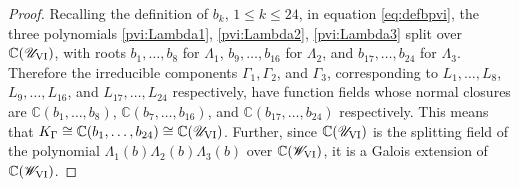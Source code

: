 \documentclass[a4paper,reqno]{amsart}
\numberwithin{equation}{section}
\newcommand{\C}{\mathbb{C}}
\numberwithin{equation}{section}
\begin{document}
\begin{proof}
Recalling the definition of $b_k$, $1\leq k\leq 24$, in equation \eqref{eq:defbpvi}, the three polynomials \eqref{pvi:Lambda1}, \eqref{pvi:Lambda2}, \eqref{pvi:Lambda3} split over $\C(\mathscr{U}_{\rm{VI}})$, with roots $b_1,\dots,b_8$ for $\Lambda_1$,  $b_9,\dots,b_{16}$ for $\Lambda_2$, and $b_{17},\dots,b_{24}$ for $\Lambda_3$.
Therefore the irreducible components $\Gamma_1,\Gamma_2$, and $\Gamma_3$, corresponding to $L_1,\dots,L_8$, $L_9,\dots,L_{16}$, and  $L_{17},\dots,L_{24}$ respectively, have function fields whose normal closures are $\C(b_1,\dots,b_8)$, $\C(b_7,\dots,b_{16})$, and 
$\C(b_{17},\dots,b_{24})$ respectively.
This means that $K_{\Gamma}\cong\mathbb{C}(b_1,\dots, b_{24}) \cong \C(\mathscr{U}_{\rm{VI}})$.
    Further, since $\C(\mathscr{U}_{\rm{VI}
    })$ is the splitting field of the polynomial $\Lambda_1(b)\Lambda_2(b)\Lambda_3(b)$ over $\mathbb{C}(\mathscr{W}_{\rm{VI}})$, it is a Galois extension of $\mathbb{C}(\mathscr{W}_{\rm{VI}})$.

\begingroup

\setlength{\tabcolsep}{15pt} %
\renewcommand{\arraystretch}{1.75} %


\end{proof}
\end{document}
